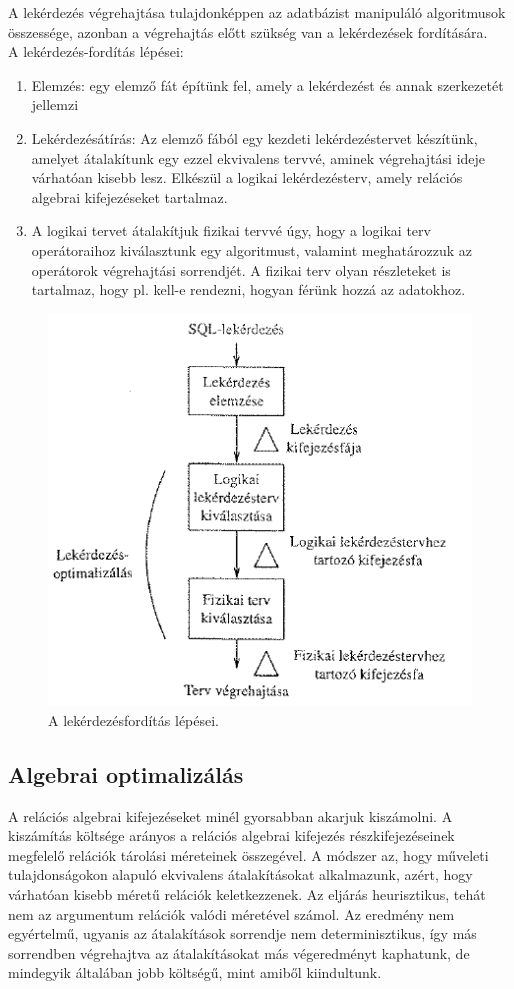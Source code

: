 \documentclass[margin=0px]{article}
\begin{document}
	A lekérdezés végrehajtása tulajdonképpen az adatbázist manipuláló algoritmusok összessége, azonban a végrehajtás
	előtt szükség van a lekérdezések fordítására. \\
	
	\noindent A lekérdezés-fordítás lépései:
	\begin{enumerate}
		\item	Elemzés: egy elemző fát építünk fel, amely a lekérdezést és annak szerkezetét jellemzi
		
		\item	Lekérdezésátírás: Az elemző fából egy kezdeti lekérdezéstervet készítünk, amelyet átalakítunk
		egy ezzel ekvivalens tervvé, aminek végrehajtási ideje várhatóan kisebb lesz. Elkészül a logikai
		lekérdezésterv, amely relációs algebrai kifejezéseket tartalmaz.
		
		\item	A logikai tervet átalakítjuk fizikai tervvé úgy, hogy a logikai terv operátoraihoz kiválasztunk egy
		algoritmust,  valamint meghatározzuk az operátorok végrehajtási sorrendjét. A fizikai terv olyan részleteket is
		tartalmaz, hogy pl. kell-e rendezni, hogyan férünk hozzá az adatokhoz.
	\end{enumerate}
	
	\begin{figure}[H]
		\centering
		\includegraphics[width=0.5\linewidth]{img/querycompiling}
		\caption{A lekérdezésfordítás lépései.}
		\label{fig:querycompiling}
	\end{figure}
	
	\subsection{Algebrai optimalizálás}
	
	A relációs algebrai kifejezéseket minél gyorsabban akarjuk kiszámolni. A kiszámítás költsége arányos a relációs algebrai kifejezés részkifejezéseinek megfelelő relációk tárolási méreteinek összegével. A módszer az, hogy műveleti tulajdonságokon alapuló ekvivalens átalakításokat alkalmazunk, azért, hogy várhatóan kisebb méretű relációk keletkezzenek. Az eljárás heurisztikus, tehát nem az argumentum relációk valódi méretével számol. Az eredmény nem egyértelmű, ugyanis az átalakítások sorrendje nem determinisztikus, így más sorrendben végrehajtva az átalakításokat más végeredményt kaphatunk, de mindegyik általában jobb költségű, mint amiből kiindultunk.\\
	
\end{document}
